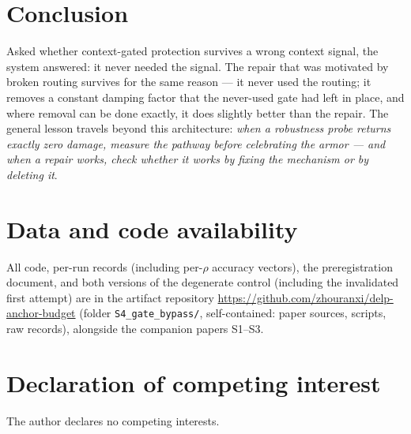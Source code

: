\documentclass[review,12pt,number]{elsarticle}
\begin{document}
\section{Conclusion}

Asked whether context-gated protection survives a wrong context signal,
the system answered: it never needed the signal. The repair that was
motivated by broken routing survives for the same reason --- it never
used the routing; it removes a constant damping factor that the
never-used gate had left in place, and where removal can be done
exactly, it does slightly better than the repair. The general lesson
travels beyond this architecture: \emph{when a robustness probe returns
exactly zero damage, measure the pathway before celebrating the armor
--- and when a repair works, check whether it works by fixing the
mechanism or by deleting it}.

\section*{Data and code availability}
All code, per-run records (including per-$\rho$ accuracy vectors), the
preregistration document, and both versions of the degenerate control
(including the invalidated first attempt) are in the artifact repository
\url{https://github.com/zhouranxi/delp-anchor-budget} (folder
\texttt{S4\_gate\_bypass/}, self-contained: paper sources, scripts, raw
records), alongside the companion papers S1--S3.

\section*{Declaration of competing interest}
The author declares no competing interests.



\end{document}
